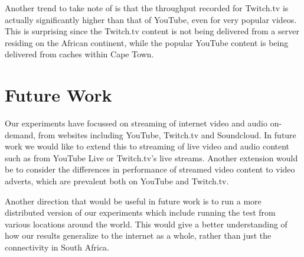 \documentclass{sig-alternate-05-2015}
\begin{document}
Another trend to take note of is that the throughput recorded for Twitch.tv is actually significantly higher than that of YouTube, even for very popular videos. This is surprising since the Twitch.tv content is not being delivered from a server residing on the African continent, while the popular YouTube content is being delivered from caches within Cape Town.

\section{Future Work}\label{sec:futurework}
Our experiments have focussed on streaming of internet video and audio on-demand, from websites including YouTube, Twitch.tv and Soundcloud. In future work we would like to extend this to streaming of live video and audio content such as from YouTube Live or Twitch.tv's live streams. Another extension would be to consider the differences in performance of streamed video content to video adverts, which are prevalent both on YouTube and Twitch.tv.

Another direction that would be useful in future work is to run a more distributed version of our experiments which include running the test from various locations around the world. This would give a better understanding of how our results generalize to the internet as a whole, rather than just the connectivity in South Africa.

\small


\end{document}
